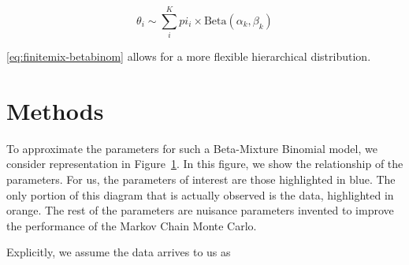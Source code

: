 \documentclass{article}
\begin{document}
\begin{equation}\label{eq:finitemix-betabinom}
\theta_i \sim \sum_i^K pi_i \times \text{Beta}(\alpha_k, \beta_k)
\end{equation}

\eqref{eq:finitemix-betabinom} allows for a more flexible hierarchical distribution. 
\newpage

\section{Methods}

To approximate the parameters for such a Beta-Mixture Binomial model, we consider representation in Figure~\ref{fig:diagram}. In this figure, we show the relationship of the parameters. For us, the parameters of interest are those highlighted in {\color{blue}blue}. The only portion of this diagram that is actually observed is the data, highlighted in {\color{orange}orange}. The rest of the parameters are nuisance parameters invented to improve the performance of the Markov Chain Monte Carlo. \\

\begin{figure}
\centering
{}
\label{fig:diagram}
\end{figure}

Explicitly, we assume the data arrives to us as
\end{document}
